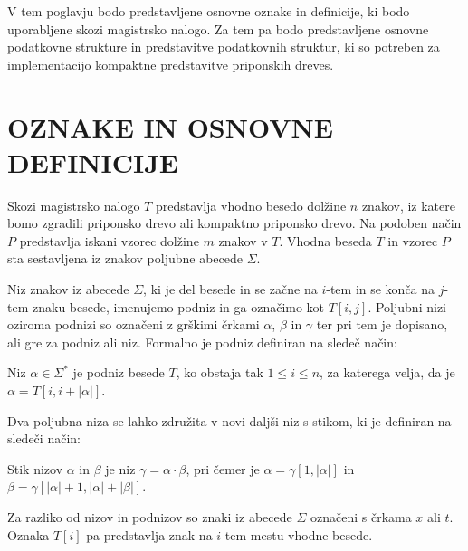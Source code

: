 
V tem poglavju bodo predstavljene osnovne oznake in definicije, ki bodo uporabljene skozi magistrsko nalogo. Za tem pa bodo predstavljene osnovne podatkovne strukture in predstavitve podatkovnih struktur, ki so potreben za implementacijo kompaktne predstavitve priponskih dreves.


\section{OZNAKE IN OSNOVNE DEFINICIJE}\label{sec:def}
Skozi magistrsko nalogo $T$ predstavlja vhodno besedo dolžine $n$ znakov, iz katere bomo zgradili priponsko drevo ali kompaktno priponsko drevo. Na podoben način $P$ predstavlja iskani vzorec dolžine $m$ znakov v $T$. Vhodna beseda $T$ in vzorec $P$ sta sestavljena iz znakov poljubne abecede $\Sigma$.

Niz znakov iz abecede $\Sigma$, ki je del besede in se začne na $i$-tem in se konča na $j$-tem znaku besede, imenujemo podniz in ga označimo kot $T[i,j]$. Poljubni nizi oziroma podnizi so označeni z grškimi črkami $\alpha$, $\beta$ in $\gamma$ ter pri tem je dopisano, ali gre za podniz ali niz. Formalno je podniz definiran na sledeč način:
\begin{defi}
    Niz $\alpha\in\Sigma^*$ je podniz besede $T$, ko obstaja tak $1\le i\le n$, za katerega velja, da je  $\alpha=T[i,i+|\alpha|]$. 
\end{defi}
Dva poljubna niza se lahko združita v novi daljši niz s stikom, ki je definiran na sledeči način:
\begin{defi}
    Stik nizov $\alpha$ in $\beta$ je niz $\gamma=\alpha\cdot\beta$, pri čemer je $\alpha=\gamma[1,|\alpha|]$ in $\beta=\gamma[|\alpha|+1,|\alpha|+|\beta|]$.
\end{defi}

Za razliko od nizov in podnizov so znaki iz abecede $\Sigma$ označeni s črkama $x$ ali $t$. Oznaka $T[i]$ pa predstavlja znak na $i$-tem mestu vhodne besede.

